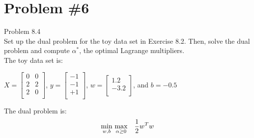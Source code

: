 \documentclass[12pt]{article}
\begin{document}
	\section*{Problem \#6}
	Problem 8.4 \\
	Set up the dual problem for the toy data set in Exercise 8.2. Then, solve the dual problem and compute $\alpha^*$, the optimal Lagrange
	multipliers. \\
	The toy data set is:
	\begin{center}
		$X = \left[
		\begin{array}{cc}
		0 & 0 \\
		2 &2 \\
		2 & 0 \\
		\end{array}
		\right]$, $y = \left[ 
		\begin{array}{c}
		-1\\
		-1\\
		+1\\
		\end{array} \right]$,
		$w = \left[ 
		\begin{array}{c}
		1.2\\
		-3.2\\
		\end{array} \right]$, and 
		$b=-0.5$
	\end{center}
	The dual problem is:
	\begin{equation*}
		\underset{w, b}{\text{min}} \ \underset{\alpha \ge 0}{\text{max}}\quad \frac{1}{2}w^T w \\
	\end{equation*}
	
\end{document}
